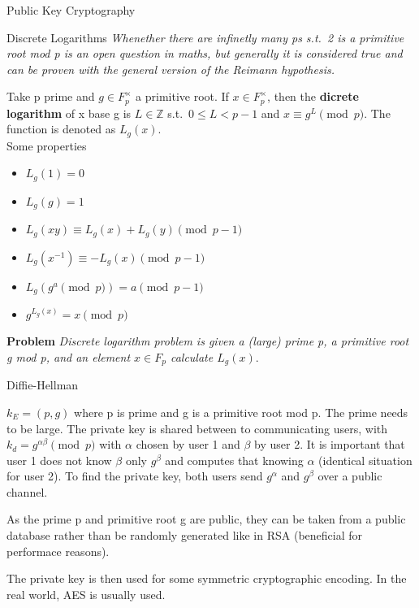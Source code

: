\documentclass[12pt, letterpaper]{article}
\begin{document}
\begin{section}{Public Key Cryptography}
\begin{subsection}{Discrete Logarithms}
    \textit{Whenether there are infinetly many ps s.t.\ 2 is a primitive root
      mod p is an open question in maths, but generally it is considered true
      and can be proven with the general version of the Reimann hypothesis.}

    Take p prime and \(g \in F_{p}^{\times}\) a primitive root. If
    \(x \in F_{p}^{\times}\), then the \textbf{dicrete logarithm} of x base g
    is \(L \in \mathbb{Z}\) s.t.\ \(0 \leq L < p - 1\) and \(x \equiv g^{L}
    \pmod{p}\). The function is denoted as \(L_{g}(x)\). \\
    Some properties
    \begin{itemize}
      \item \(L_{g}(1) = 0\)
      \item \(L_{g}(g) = 1\)
      \item \(L_{g}(xy) \equiv L_{g}(x) + L_{g}(y) \pmod{p - 1}\)
      \item \(L_{g}(x^{-1}) \equiv -L_{g}(x) \pmod{p - 1}\)
      \item \(L_{g}(g^{a} \pmod{p}) = a \pmod{p - 1}\)
      \item \(g^{L_{g}(x)} = x \pmod{p}\)
    \end{itemize}

    \textbf{Problem}
    \textit{Discrete logarithm problem is given a (large) prime p, a primitive
    root g mod p, and an element \(x \in F_{p}\) calculate \(L_{g}(x)\)}.

  \end{subsection}

  \begin{subsection}{Diffie-Hellman}

    \(k_{E} = (p, g)\) where p is prime and g is a primitive root mod p. The
    prime needs to be large. The private key is shared between to communicating
    users, with \(k_{d} = g^{\alpha\beta} \pmod{p}\) with \(\alpha\) chosen by
    user 1 and \(\beta\) by user 2. It is important that user 1 does not know
    \(\beta\) only \(g^{\beta}\) and computes that knowing \(\alpha\)
    (identical situation for user 2). To find the private key, both users send
    \(g^{\alpha}\) and \(g^{\beta}\) over a public channel.

    As the prime p and primitive root g are public, they can be taken from a
    public database rather than be randomly generated like in RSA (beneficial
    for performace reasons).

    The private key is then used for some symmetric cryptographic encoding. In
    the real world, AES is usually used.


\end{subsection}
\end{section}
\end{document}
